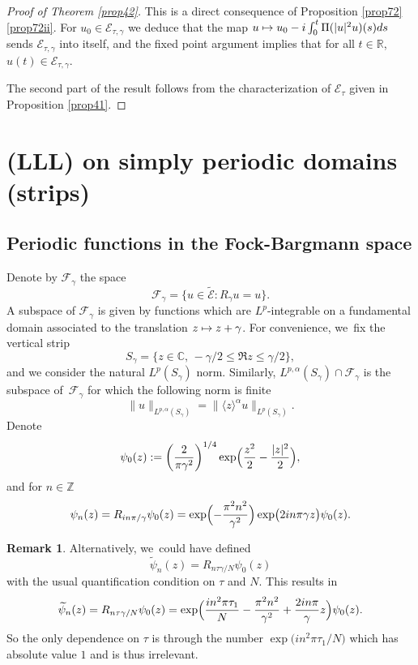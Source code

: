 \documentclass[JEP,XML,SOM,Unicode,NoFloatCountersInSection,published]{cedram}
\newcommand\mto{\mathchoice{\longmapsto}{\mapsto}{\mapsto}{\mapsto}}
\let\sep:
\theoremstyle{definition}
\newtheorem{remark}[theorem]{Remark}
\let\EE\exp
\let\dis\relax
\let\wt\widetilde
\newcommand\R{\mathbb R}
\newcommand\Z{\mathbb Z}
\begin{document}
\begin{proof}[Proof of Theorem \ref{prop42}]
This is a direct consequence of Proposition \ref{prop72}\eqref{prop72ii}. For $u_{0}\in \mathcal{E}_{\tau, \gamma}$ we deduce that the map $\dis u\mto u_{0}-i\int_{0}^{t} \Pi(\vert u\vert^2u)(s)ds$ sends $\mathcal{E}_{\tau, \gamma}$ into itself, and the fixed point argument implies that for all $t\in \R$, $u(t)\in \mathcal{E}_{\tau, \gamma}$.

The second part of the result follows from the characterization of $\mathcal{E}_{\tau}$ given in Proposition \ref{prop41}.
\end{proof}

\section{(LLL) on simply periodic domains (strips)}
\label{section3}

\subsection{Periodic functions in the Fock-Bargmann space}
Denote by $\mathcal{F}_{\gamma}$ the space
\begin{equation*}
\mathcal{F}_{\gamma}=\bigl\{u\in \widetilde{{\mathcal{E}}}\sep R_{\gamma}u=u\bigr\}.
\end{equation*}
A subspace of $\mathcal{F}_\gamma$ is given by functions which are $L^p$-integrable on a fundamental domain associated to the translation $z \mto z+\gamma$. For convenience, we~fix the vertical strip
\[
S_\gamma = \bigl\{ z \in \mathbb{C}, \, -{\gamma}/{2} \leq \Re z \leq {\gamma}/{2} \bigr\},
\]
and we consider the natural $L^p(S_\gamma)$ norm. Similarly, $L^{p,\alpha}(S_\gamma) \cap \mathcal{F}_{\gamma} $ is the subspace of~$\mathcal{F}_\gamma$ for which the following norm is finite
\[
\| u \|_{L^{p,\alpha}(S_\gamma)} = \| \langle z \rangle^\alpha u \|_{L^p(S_\gamma)}.
\]
Denote
\[
\psi_0(z):=\left(\frac{2}{\pi \gamma^2}\right)^{1/4}\EE\Bigl({\frac{z^2}2-\frac{|z|^2}2}\Bigr),
\]
and for $n\in \Z$
\begin{equation*}
\psi_n(z) = R_{{i n \pi}/ \gamma}\psi_0(z) = \EE\Bigl({-\frac{\pi^2 n^2}{\gamma^2}}\Bigr) \EE\bigl({{2in\pi}{\gamma} z}\bigr)\psi_0(z).
\end{equation*}

\begin{remark}
Alternatively, we~could have defined
\[
\wt{\psi}_n(z) =R_{{n\tau \gamma}/ N}\psi_0(z)
\]
with the usual quantification condition on $\tau$ and $N$. This results in
\[
\wt{\psi}_n(z) =R_{{n\tau \gamma}/ N}\psi_0(z)= \EE\Bigl(\frac{i n^2 \pi \tau_1}{N} -\frac{\pi^2 n^2}{\gamma^2}+ \frac{2in\pi}{\gamma} z\Bigr) \psi_0(z).
\]
So the only dependence on $\tau$ is through the number $\EE\bigl({i {n^2 \pi \tau_1}/ {N}}\bigr)$ which has absolute value $1$ and is thus irrelevant.
\end{remark}
\end{document}

